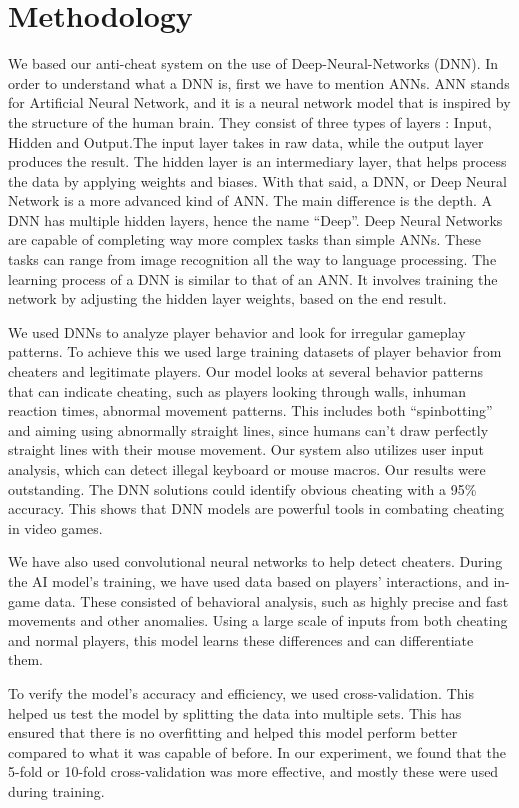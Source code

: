 \section{Methodology}
\label{ch:methodology}

We based our anti-cheat system on the use of Deep-Neural-Networks (DNN).
In order to understand what a DNN is, first we have to mention ANNs. ANN stands for Artificial Neural Network, and it is a neural network model that is inspired by the structure of the human brain. They consist of three types of layers : Input, Hidden and Output.The input layer takes in raw data, while the output layer produces the result. The hidden layer is an intermediary layer, that helps process the data by applying weights and biases.
With that said, a DNN, or Deep Neural Network is a more advanced kind of ANN. The main difference is the depth. A DNN has multiple hidden layers, hence the name “Deep”. Deep Neural Networks are capable of completing way more complex tasks than simple ANNs. These tasks can range from image recognition all the way to language processing. The learning process of a DNN is similar to that of an ANN. It involves training the network by adjusting the hidden layer weights, based on the end result.

We used DNNs to analyze player behavior and look for irregular gameplay patterns. To achieve this we used large training datasets of player behavior from cheaters and legitimate players. Our model looks at several behavior patterns that can indicate cheating, such as players looking through walls, inhuman reaction times, abnormal movement patterns. This includes both “spinbotting” and aiming using abnormally straight lines, since humans can’t draw perfectly straight lines with their mouse movement. Our system also utilizes user input analysis, which can detect illegal keyboard or mouse macros.
Our results were outstanding. The DNN solutions could identify obvious cheating with a 95\% accuracy. This shows that DNN models are powerful tools in combating cheating in video games.

We have also used convolutional neural networks to help detect cheaters. During the AI model's training, we have used data based on players' interactions, and in-game data. These consisted of behavioral analysis, such as highly precise and fast movements and other anomalies. Using a large scale of inputs from both cheating and normal players, this model learns these differences and can differentiate them.

To verify the model's accuracy and efficiency, we used cross-validation. This helped us test the model by splitting the data into multiple sets. This has ensured that there is no overfitting and helped this model perform better compared to what it was capable of before. In our experiment, we found that the 5-fold or 10-fold cross-validation was more effective, and mostly these were used during training.

